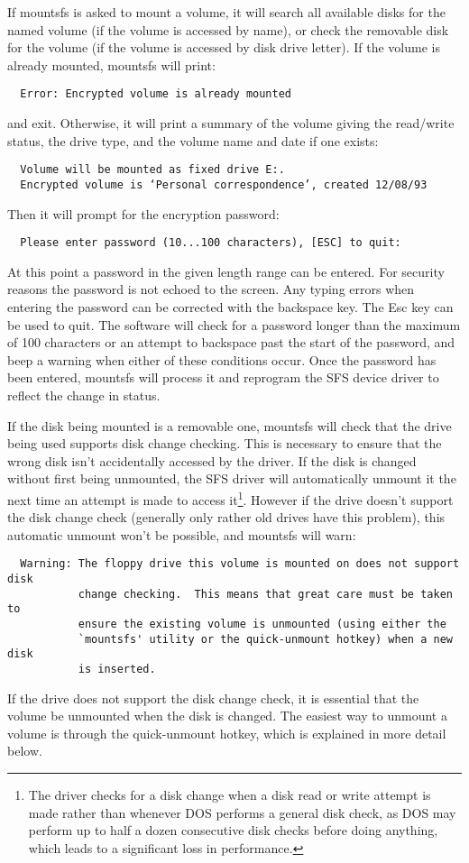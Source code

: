 If mountsfs is asked to mount a volume, it will search all available disks for
the named volume (if the volume is accessed by name), or check the removable
disk for the volume (if the volume is accessed by disk drive letter).  If the
volume is already mounted, mountsfs will print:

{\tt \verb|  |Error: Encrypted volume is already mounted}

and exit.  Otherwise, it will print a summary of the volume giving the
read/write status, the drive type, and the volume name and date if one exists:

{\tt \verb|  |Volume will be mounted as fixed drive E:.\\
     \verb|  |Encrypted volume is `Personal correspondence', created 12/08/93}

Then it will prompt for the encryption password:

{\tt \verb|  |Please enter password (10...100 characters), [ESC] to quit:}

At this point a password in the given length range can be entered.  For
security reasons the password is not echoed to the screen.  Any typing errors
when entering the password can be corrected with the backspace key.  The Esc
key can be used to quit.  The software will check for a password longer than
the maximum of 100 characters or an attempt to backspace past the start of the
password, and beep a warning when either of these conditions occur.  Once the
password has been entered, mountsfs will process it and reprogram the SFS
device driver to reflect the change in status.

If the disk being mounted is a removable one, mountsfs will check that the
drive being used supports disk change checking.  This is necessary to ensure
that the wrong disk isn't accidentally accessed by the driver.  If the disk is
changed without first being unmounted, the SFS driver will automatically
unmount it the next time an attempt is made to access it\footnote{
              The driver checks for a disk change when a disk read or write
              attempt is made rather than whenever DOS performs a general disk
              check, as DOS may perform up to half a dozen consecutive disk
              checks before doing anything, which leads to a significant loss
              in performance.
}.  However if the
drive doesn't support the disk change check (generally only rather old drives
have this problem), this automatic unmount won't be possible, and mountsfs will
warn:
{\small

\begin{verbatim}
  Warning: The floppy drive this volume is mounted on does not support disk
           change checking.  This means that great care must be taken to
           ensure the existing volume is unmounted (using either the
           `mountsfs' utility or the quick-unmount hotkey) when a new disk
           is inserted.
\end{verbatim}

}
If the drive does not support the disk change check, it is essential that the
volume be unmounted when the disk is changed.  The easiest way to unmount a
volume is through the quick-unmount hotkey, which is explained in more detail
below.


